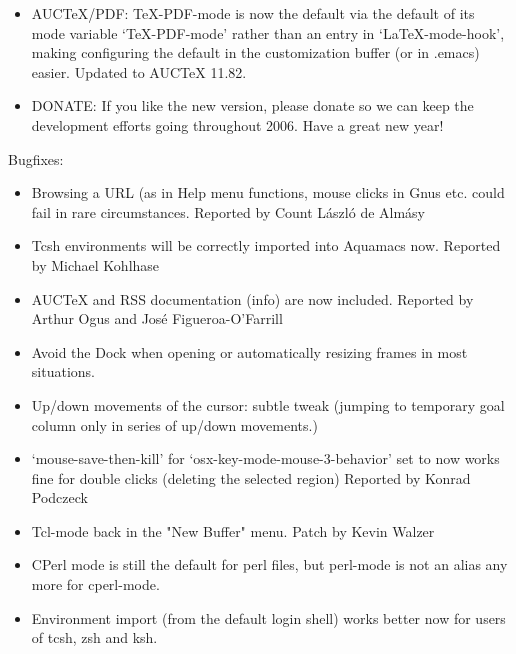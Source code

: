 \begin{itemize}
\item AUCTeX/PDF: TeX-PDF-mode is now the default via the default of
        its mode variable `TeX-PDF-mode' rather than an entry in
        `LaTeX-mode-hook', making configuring the default in the
        customization buffer (or in .emacs) easier. Updated to AUCTeX 11.82.

\item DONATE: If you like the new version, please donate so we can
        keep the development efforts going throughout 2006. Have a great
        new year!
\end{itemize}

Bugfixes:

\begin{itemize}
\item Browsing a URL (as in Help menu functions, mouse clicks in Gnus
        etc. could fail in rare circumstances.
        Reported by Count László de Almásy

\item Tcsh environments will be correctly imported into Aquamacs now.
        Reported by Michael Kohlhase

\item AUCTeX and RSS documentation (info) are now included.
        Reported by Arthur Ogus and José Figueroa-O'Farrill

\item Avoid the Dock when opening or automatically resizing frames in
        most situations.

\item Up/down movements of the cursor: subtle tweak (jumping to
        temporary goal column only in series of up/down movements.)

\item `mouse-save-then-kill' for `osx-key-mode-mouse-3-behavior' set
        to now works fine for double clicks (deleting the selected region)
        Reported by Konrad Podczeck

\item Tcl-mode back in the "New Buffer" menu.
        Patch by Kevin Walzer

\item CPerl mode is still the default for perl files, but perl-mode is
        not an alias any more for cperl-mode.

\item Environment import (from the default login shell) works better
        now for users of tcsh, zsh and ksh.



\end{itemize}

